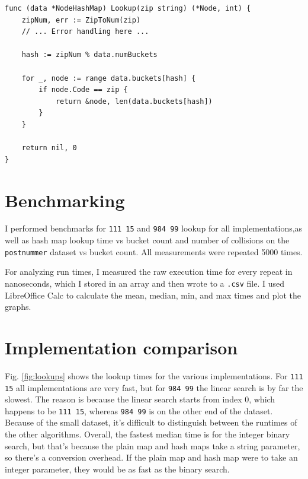 \documentclass[a4paper,11pt]{article}
\begin{document}
    \begin{verbatim}
func (data *NodeHashMap) Lookup(zip string) (*Node, int) {
    zipNum, err := ZipToNum(zip)
    // ... Error handling here ...

    hash := zipNum % data.numBuckets

    for _, node := range data.buckets[hash] {
        if node.Code == zip {
            return &node, len(data.buckets[hash])
        }
    }

    return nil, 0
}
    \end{verbatim}

    \section*{Benchmarking}

    I performed benchmarks for \texttt{111 15} and \texttt{984 99} lookup for all implementations,as well as hash map lookup time vs bucket count and number of collisions on the \texttt{postnummer} dataset vs bucket count. All measurements were repeated 5000 times.

    For analyzing run times, I measured the raw execution time for every repeat in nanoseconds, which I stored in an array and then wrote to a \texttt{.csv} file. I used LibreOffice Calc to calculate the mean, median, min, and max times and plot the graphs.

    \section*{Implementation comparison}

    Fig. \ref{fig:lookups} shows the lookup times for the various implementations. For \texttt{111 15} all implementations are very fast, but for \texttt{984 99} the linear search is by far the slowest. The reason is because the linear search starts from index 0, which happens to be \texttt{111 15}, whereas \texttt{984 99} is on the other end of the dataset. Because of the small dataset, it's difficult to distinguish between the runtimes of the other algorithms. Overall, the fastest median time is for the integer binary search, but that's because the plain map and hash maps take a string parameter, so there's a conversion overhead. If the plain map and hash map were to take an integer parameter, they would be as fast as the binary search.
\end{document}
